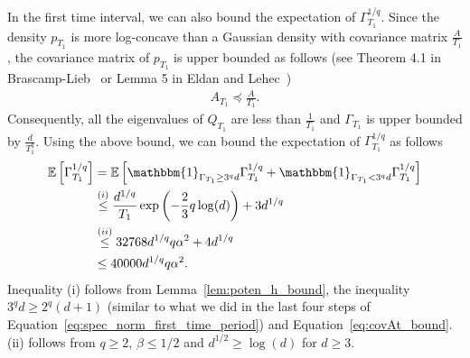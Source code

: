 \documentclass[11pt,twoside]{article}
\newcommand{\co}{A}
\newcommand{\potentwo}{\Gamma}
\newcommand{\indicator}{\mathbbm{1}}
\theoremstyle{named}
\theoremstyle{plain}
\newcommand{\Exs}{\ensuremath{{\mathbb{E}}}}
\newcommand{\usedim}{\ensuremath{d}}
\newcommand{\dims}{\usedim}
\newcommand{\brackets}[1]{\left[ #1 \right]}
\newcommand{\parenth}[1]{\left( #1 \right)}
\begin{document}
In the first time interval, we can also bound the expectation of $\potentwo_{T_1}^{1/q}$. Since the density $p_{T_1}$ is more log-concave than a Gaussian density with covariance matrix $\frac{\co}{T_1}$, the covariance matrix of $p_{T_1}$ is upper bounded as follows (see Theorem 4.1 in Brascamp-Lieb~\cite{brascamp2002extensions} or Lemma 5 in Eldan and Lehec~\cite{eldan2014bounding})
\begin{align}
  \label{eq:covAt_bound}
  A_{T_1} \preceq \frac{\co}{T_1}.
\end{align}
Consequently, all the eigenvalues of $Q_{T_1}$ are less than $\frac{1}{T_1}$ and $\potentwo_{T_1}$ is upper bounded by $\frac{\dims}{T_1^{q}}$. Using the above bound, we can bound the expectation of $\potentwo_{T_1}^{1/q}$ as follows
\begin{align}
  \label{eq:exp_spec_norm_T1_bound}
  \Exs\brackets{\potentwo_{T_1}^{1/q}} &= \Exs\brackets{\indicator_{\potentwo_{T_1} \geq 3^q \dims} \potentwo_{T_1}^{1/q} + \indicator_{\potentwo_{T_1} < 3^q \dims} \potentwo_{T_1}^{1/q} } \notag \\
  &\stackrel{(i)}{\leq} \frac{\dims^{1/q}}{T_1} \exp\parenth{- \frac{2}{3} q \log(\dims)} + 3 \dims^{1/q}  \notag \\
  &\stackrel{(ii)}{\leq} 32768 \dims^{1/q} q \alpha^2 + 4 \dims^{1/q}  \notag \\
  &\leq 40000 \dims^{1/q} q \alpha^2.
\end{align}
Inequality (i) follows from Lemma~\ref{lem:poten_h_bound}, the inequality $3^q\dims \geq 2^q(\dims+1)$ (similar to what we did in the last four steps of Equation~\eqref{eq:spec_norm_first_time_period}) and Equation~\eqref{eq:covAt_bound}. (ii) follows from $q \geq 2$, $\beta \leq {1/2}$ and $\dims^{1/2} \geq \log(\dims)$ for $\dims \geq 3$.
\end{document}
